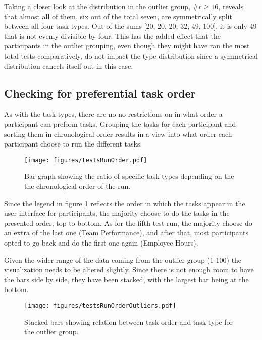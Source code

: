     Taking a closer look at the distribution in the outlier group,
    $\#r\geq16$, reveals that almost all of them, six out of the total seven,
    are symmetrically split between all four task-types. Out of the sums
    [20, 20, 20, 32, 49, 100], it is only 49 that is not evenly divisible
    by four. This has the added effect that the participants in the
    outlier grouping, even though they might have ran the most total tests
    comparatively, do not impact the type distribution since a symmetrical
    distribution cancels itself out in this case.

  \subsection{Checking for preferential task order}

    As with the task-types, there are no no restrictions on in what order a
    participant can preform tasks. Grouping the tasks for each participant
    and sorting them in chronological order results in a view into what
    order each participant choose to run the different tasks.

    \begin{figure}[ht!]
      \centering
      \texttt{[image: figures/testsRunOrder.pdf]}
      \caption{
        Bar-graph showing the ratio of specific task-types depending on the
        the chronological order of the run.
      }
      \label{label_testsRunOrder}
    \end{figure}

    Since the legend in figure \ref{label_testsRunOrder} reflects the order
    in which the tasks appear in the user interface for participants, the
    majority choose to do the tasks in the presented order, top to bottom.
    As for the fifth test run, the majority choose do an extra of the last
    one (Team Performance), and after that, most participants opted to go
    back and do the first one again (Employee Hours).

    Given the wider range of the data coming from the outlier group (1-100)
    the visualization needs to be altered slightly. Since there is not
    enough room to have the bars side by side, they have been stacked, with
    the largest bar being at the bottom.
    \begin{figure}[ht!]
      \centering
      \texttt{[image: figures/testsRunOrderOutliers.pdf]}
      \caption{
        Stacked bars showing relation between task order and task type for
        the outlier group.
      }
    \end{figure}

